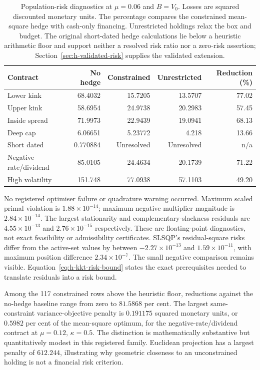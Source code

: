 \documentclass[11pt]{article}
\begin{document}
\begin{table}[tb]\centering\small
\begin{tabular}{lrrrr}\toprule
Contract & No hedge & Constrained & Unrestricted & Reduction (\%)\\\midrule
Lower kink & 68.4032 & 15.7205 & 13.5707 & 77.02 \\
Upper kink & 58.6954 & 24.9738 & 20.2983 & 57.45 \\
Inside spread & 71.9973 & 22.9439 & 19.0941 & 68.13 \\
Deep cap & 6.06651 & 5.23772 & 4.218 & 13.66 \\
Short dated & 0.770884 & Unresolved & Unresolved & n/a \\
Negative rate/dividend & 85.0105 & 24.4634 & 20.1739 & 71.22 \\
High volatility & 151.748 & 77.0938 & 57.1103 & 49.20 \\
\bottomrule\end{tabular}
\caption{Population-risk diagnostics at $\mu=0.06$ and $B=V_0$. Losses are squared discounted monetary units. The percentage compares the constrained mean-square hedge with cash-only financing. Unrestricted holdings relax the box and budget. The original short-dated hedge calculations lie below a heuristic arithmetic floor and support neither a resolved risk ratio nor a zero-risk assertion; Section~\ref{sec:h-validated-risk} supplies the validated extension.}
\label{tab:h-risk-comparison}\end{table}

No registered optimiser failure or quadrature warning occurred.
Maximum scaled primal violation is $1.88\times10^{-14}$; maximum
negative multiplier magnitude is $2.84\times10^{-14}$.
The largest stationarity and complementary-slackness residuals are
$4.55\times10^{-13}$ and $2.76\times10^{-15}$ respectively.
These are floating-point diagnostics, not exact feasibility or
admissibility certificates. SLSQP's residual-square risks differ from
the active-set values by between $-2.27\times10^{-13}$ and
$1.59\times10^{-11}$, with maximum position difference
$2.34\times10^{-7}$. The small negative comparison remains visible.
Equation~\eqref{eq:h-kkt-risk-bound} states the exact prerequisites
needed to translate residuals into a risk bound.

Among the 117 constrained rows above the heuristic floor, reductions
against the no-hedge baseline range from zero to $81.5868$ per cent.
The largest same-constraint variance-objective penalty is $0.191175$
squared monetary units, or $0.5982$ per cent of the mean-square
optimum, for the negative-rate/dividend contract at $\mu=0.12$,
$\kappa=0.5$. The distinction is mathematically substantive but
quantitatively modest in this registered family. Euclidean projection
has a largest penalty of $612.244$, illustrating why geometric
closeness to an unconstrained holding is not a financial risk criterion.
\end{document}
